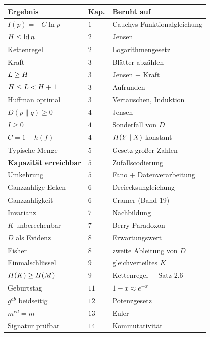 \begin{merksatz}
\begin{center}
{\small
\renewcommand{\arraystretch}{1.42}
\begin{tabular}{@{}P{3.4cm}P{1.2cm}P{3.6cm}@{}}
\toprule
\textbf{Ergebnis} & \textbf{Kap.} & \textbf{Beruht auf}\\
\midrule
$I(p) = -C\ln p$ & $1$ & Cauchys Funktionalgleichung\\
$H \le \operatorname{ld} n$ & $2$ & Jensen\\
Kettenregel & $2$ & Logarithmengesetz\\
Kraft & $3$ & Blätter abzählen\\
$L \ge H$ & $3$ & Jensen $+$ Kraft\\
$H \le L < H+1$ & $3$ & Aufrunden\\
Huffman optimal & $3$ & Vertauschen, Induktion\\
$D(p\|q) \ge 0$ & $4$ & Jensen\\
$I \ge 0$ & $4$ & Sonderfall von $D$\\
$C = 1-h(f)$ & $4$ & $H(Y\mid X)$ konstant\\
Typische Menge & $5$ & Gesetz großer Zahlen\\
\textbf{Kapazität erreichbar} & $5$ & Zufallscodierung\\
Umkehrung & $5$ & Fano $+$ Datenverarbeitung\\
Ganzzahlige Ecken & $6$ & Dreiecksungleichung\\
Ganzzahligkeit & $6$ & Cramer (Band 19)\\
Invarianz & $7$ & Nachbildung\\
$K$ unberechenbar & $7$ & Berry-Paradoxon\\
$D$ als Evidenz & $8$ & Erwartungswert\\
Fisher & $8$ & zweite Ableitung von $D$\\
Einmalschlüssel & $9$ & gleichverteiltes $K$\\
$H(K)\ge H(M)$ & $9$ & Kettenregel $+$ Satz 2.6\\
Geburtstag & $11$ & $1-x \approx e^{-x}$\\
$g^{ab}$ beidseitig & $12$ & Potenzgesetz\\
$m^{ed}=m$ & $13$ & Euler\\
Signatur prüfbar & $14$ & Kommutativität\\
\bottomrule
\end{tabular}}
\end{center}
\end{merksatz}

